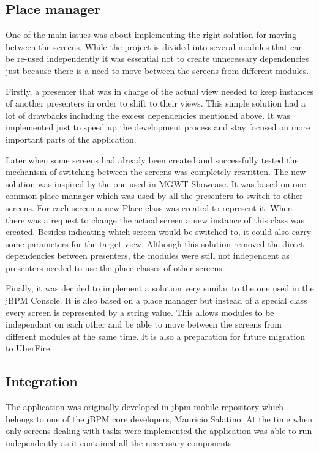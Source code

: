 \documentclass[12pt,oneside,final]{fithesis2}
\begin{document}
\subsection{Place manager}
One of the main issues was about implementing the right solution for moving between the screens.
While the project is divided into several modules that can be re-used independently it was essential not to create unnecessary dependencies just because there is a need to move between the screens from different modules.

Firstly, a presenter that was in charge of the actual view needed to keep instances of another presenters in order to shift to their views.
This simple solution had a lot of drawbacks including the excess dependencies mentioned above.
It was implemented just to speed up the development process and stay focused on more important parts of the application.

Later when some screens had already been created and successfully tested the mechanism of switching between the screens was completely rewritten.
The new solution was inspired by the one used in MGWT Showcase\footnotemark{}.
It was based on one common place manager which was used by all the presenters to switch to other screens.
For each screen a new Place class was created to represent it.
When there was a request to change the actual screen a new instance of this class was created.
Besides indicating which screen would be switched to, it could also carry some parameters for the target view.
Although this solution removed the direct dependencies between presenters, the modules were still not independent as presenters needed to use the place classes of other screens.

Finally, it was decided to implement a solution very similar to the one used in the jBPM Console.
It is also based on a place manager but instead of a special class every screen is represented by a string value.
This allows modules to be independant on each other and be able to move between the screens from different modules at the same time.
It is also a preparation for future migration to UberFire.

\subsection{Integration}
The application was originally developed in jbpm-mobile\footnotemark{} repository which belongs to one of the jBPM core developers, Mauricio Salatino.
At the time when only screens dealing with tasks were implemented the application was able to run independently as it contained all the neccessary components.
\end{document}
